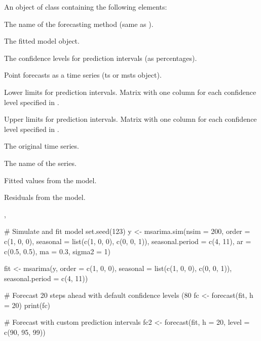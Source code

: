 \documentclass[a4paper]{book}
\begin{document}
\begin{Value}
An object of class  containing the following elements:
\begin{ldescription}
\item[\code{method}] The name of the forecasting method (same as ).
\item[\code{model}] The fitted  model object.
\item[\code{level}] The confidence levels for prediction intervals (as percentages).
\item[\code{mean}] Point forecasts as a time series (ts or msts object).
\item[\code{lower}] Lower limits for prediction intervals. Matrix with one column for each
confidence level specified in .
\item[\code{upper}] Upper limits for prediction intervals. Matrix with one column for each
confidence level specified in .
\item[\code{x}] The original time series.
\item[\code{series}] The name of the series.
\item[\code{fitted}] Fitted values from the model.
\item[\code{residuals}] Residuals from the model.
\end{ldescription}
\end{Value}
%
\begin{SeeAlso}
, 
\end{SeeAlso}
%
\begin{Examples}
\begin{ExampleCode}
# Simulate and fit model
set.seed(123)
y <- msarima.sim(nsim = 200,
                 order = c(1, 0, 0),
                 seasonal = list(c(1, 0, 0), c(0, 0, 1)),
                 seasonal.period = c(4, 11),
                 ar = c(0.5, 0.5), ma = 0.3, sigma2 = 1)

fit <- msarima(y, order = c(1, 0, 0),
               seasonal = list(c(1, 0, 0), c(0, 0, 1)),
               seasonal.period = c(4, 11))

# Forecast 20 steps ahead with default confidence levels (80%
fc <- forecast(fit, h = 20)
print(fc)

# Forecast with custom prediction intervals
fc2 <- forecast(fit, h = 20, level = c(90, 95, 99))

\end{ExampleCode}
\end{Examples}
\end{document}
